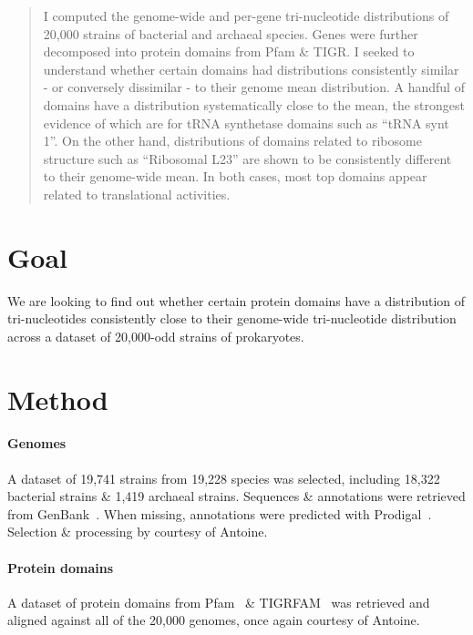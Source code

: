 \documentclass[12pt]{article}
\begin{document}
\maketitle

\begin{abstract}
I computed the genome-wide and per-gene tri-nucleotide distributions of 20,000 strains of bacterial and archaeal species. Genes were further decomposed into protein domains from Pfam \& TIGR. I seeked to understand whether certain domains had distributions consistently similar - or conversely dissimilar - to their genome mean distribution. A handful of domains have a distribution systematically close to the mean, the strongest evidence of which are for tRNA synthetase domains such as ``tRNA synt 1''. On the other hand, distributions of domains related to ribosome structure such as ``Ribosomal L23'' are shown to be consistently different to their genome-wide mean. In both cases, most top domains appear related to translational activities.
\end{abstract}

\section{Goal}
We are looking to find out whether certain protein domains have a distribution of tri-nucleotides consistently close to their genome-wide tri-nucleotide distribution across a dataset of 20,000-odd strains of prokaryotes.

\section{Method}

\paragraph{Genomes}
A dataset of 19,741 strains from 19,228 species was selected, including 18,322 bacterial strains \& 1,419 archaeal strains. Sequences \& annotations were retrieved from GenBank~\cite{benson2012genbank}. When missing, annotations were predicted with Prodigal~\cite{hyatt2010prodigal}. Selection \& processing by courtesy of Antoine.

\paragraph{Protein domains}
A dataset of protein domains from Pfam~\cite{bateman2004pfam} \& TIGRFAM~\cite{haft2003tigrfams} was retrieved and aligned against all of the 20,000 genomes, once again courtesy of Antoine.
\end{document}
